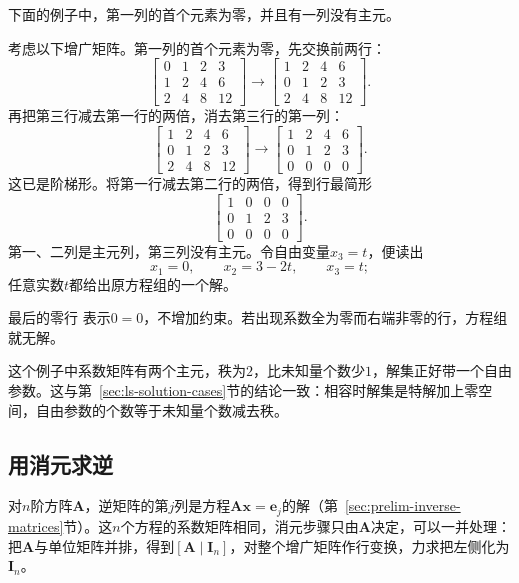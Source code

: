 下面的例子中，第一列的首个元素为零，并且有一列没有主元。
\begin{example}[换行、消元与自由变量]
\label{ex:ls-elementary-row-reduction}
考虑以下增广矩阵。第一列的首个元素为零，先交换前两行：
\[
 \left[\begin{array}{ccc|c}0&1&2&3\\1&2&4&6\\2&4&8&12\end{array}\right]
 \longrightarrow
 \left[\begin{array}{ccc|c}1&2&4&6\\0&1&2&3\\2&4&8&12\end{array}\right].
\]
再把第三行减去第一行的两倍，消去第三行的第一列：
\[
 \left[\begin{array}{ccc|c}1&2&4&6\\0&1&2&3\\2&4&8&12\end{array}\right]
 \longrightarrow
 \left[\begin{array}{ccc|c}1&2&4&6\\0&1&2&3\\0&0&0&0\end{array}\right].
\]
这已是阶梯形。将第一行减去第二行的两倍，得到行最简形
\[
 \left[\begin{array}{ccc|c}1&0&0&0\\0&1&2&3\\0&0&0&0\end{array}\right].
\]
第一、二列是主元列，第三列没有主元。令自由变量$x_3=t$，便读出
\[
 x_1=0,\qquad x_2=3-2t,\qquad x_3=t ;
\]
任意实数$t$都给出原方程组的一个解。

最后的零行
表示$0=0$，不增加约束。若出现系数全为零而右端非零的行，方程组就无解。
\end{example}

这个例子中系数矩阵有两个主元，秩为$2$，比未知量个数少$1$，解集正好带一个自由参数。这与第~\ref{sec:ls-solution-cases}节的结论一致：相容时解集是特解加上零空间，自由参数的个数等于未知量个数减去秩。

\subsection{用消元求逆}
对$n$阶方阵$\bm A$，逆矩阵的第$j$列是方程$\bm A\bm x=\bm e_j$的解（第~\ref{sec:prelim-inverse-matrices}节）。这$n$个方程的系数矩阵相同，消元步骤只由$\bm A$决定，可以一并处理：把$\bm A$与单位矩阵并排，得到$[\bm A\mid\bm I_n]$，对整个增广矩阵作行变换，力求把左侧化为$\bm I_n$。

